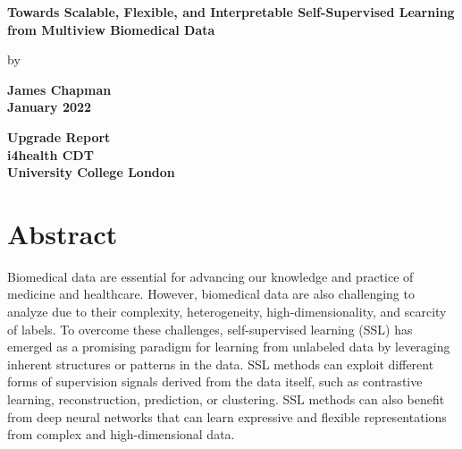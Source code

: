 \documentclass{report}
\author{James Chapman}
\numberwithin{figure}{chapter}
\numberwithin{table}{section}
\begin{document}
\begin{titlepage}
\begin{center}
    {\LARGE\textbf{Towards Scalable, Flexible, and Interpretable Self-Supervised Learning from Multiview Biomedical Data}
\author{James Chapman\\
    \\}}

    \vspace{0.8cm}
    by\\
    \vspace{0.8cm}

    {\LARGE\textbf{James Chapman\\}}
    \vspace{1.5cm}
    {\LARGE\textbf{January 2022}}

    \vfill

    \textbf{       
    Upgrade Report\\
    \vspace{1cm}
    i4health CDT\\
    University College London\\}

    \vspace{2cm}
\end{center}
\end{titlepage}

\onehalfspacing

\newpage
\chapter*{Abstract} %

Biomedical data are essential for advancing our knowledge and practice of medicine and healthcare. However, biomedical data are also challenging to analyze due to their complexity, heterogeneity, high-dimensionality, and scarcity of labels. To overcome these challenges, self-supervised learning (SSL) has emerged as a promising paradigm for learning from unlabeled data by leveraging inherent structures or patterns in the data. SSL methods can exploit different forms of supervision signals derived from the data itself, such as contrastive learning, reconstruction, prediction, or clustering. SSL methods can also benefit from deep neural networks that can learn expressive and flexible representations from complex and high-dimensional data.
\end{document}
